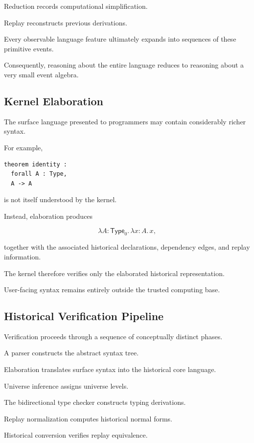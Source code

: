 \documentclass[12pt,oneside]{article}
\theoremstyle{definition}
\theoremstyle{remark}
\newcommand{\Type}{\mathsf{Type}}
\begin{document}
Reduction records computational simplification.

Replay reconstructs previous derivations.

Every observable language feature ultimately expands into sequences of these
primitive events.

Consequently, reasoning about the entire language reduces to reasoning about a
very small event algebra.

\subsection{Kernel Elaboration}

The surface language presented to programmers may contain considerably richer
syntax.

For example,

\begin{verbatim}
theorem identity :
  forall A : Type,
  A -> A
\end{verbatim}

is not itself understood by the kernel.

Instead, elaboration produces

\[
\lambda
A:\Type_0.
\,
\lambda
x:A.
\,
x,
\]

together with the associated historical declarations, dependency edges, and
replay information.

The kernel therefore verifies only the elaborated historical representation.

User-facing syntax remains entirely outside the trusted computing base.

\subsection{Historical Verification Pipeline}

Verification proceeds through a sequence of conceptually distinct phases.

A parser constructs the abstract syntax tree.

Elaboration translates surface syntax into the historical core language.

Universe inference assigns universe levels.

The bidirectional type checker constructs typing derivations.

Replay normalization computes historical normal forms.

Historical conversion verifies replay equivalence.
\end{document}
